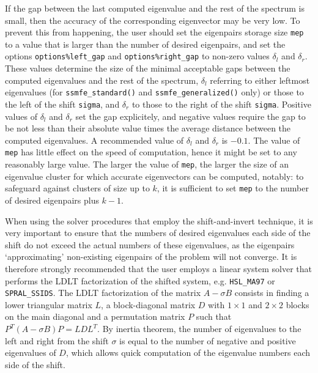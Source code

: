 If the gap %
between the last computed eigenvalue 
and the rest of the spectrum is small,
then the accuracy of the corresponding eigenvector may be very low.
To prevent this from happening,
the user should set the eigenpairs storage size {\tt mep}
to a value that is larger than the number of desired eigenpairs,
and set the options 
{\tt options\%left\_gap}
and
{\tt options\%right\_gap}
to non-zero values $\delta_l$ and $\delta_r$.
These values
determine the size of the minimal acceptable gaps
between the computed eigenvalues and the rest of the spectrum,
$\delta_l$ referring to either leftmost eigenvalues
(for {\tt ssmfe\_standard()} and {\tt ssmfe\_generalized()} only)
or those to the left of the shift {\tt sigma},
and $\delta_r$
to those to the right of the shift {\tt sigma}.
Positive values of $\delta_l$ and $\delta_r$
set the gap explicitely,
and negative values
require the gap to be not less than their absolute value times
the average distance between the computed eigenvalues.
A recommended value of $\delta_l$ and $\delta_r$ is $-0.1$.
The value of {\tt mep} %
has little effect on
the speed of computation,
hence it might be set to any reasonably large value.
The larger the value of {\tt mep}, 
the larger the size of an eigenvalue cluster
for which accurate eigenvectors can be computed, notably:
to safeguard against clusters of size up to $k$,
it is sufficient to set {\tt mep} to the number of desired eigenpairs
plus $k - 1$.

When using the solver procedures that employ the shift-and-invert technique,
it is very important to ensure that the numbers of desired eigenvalues
each side of the shift do not exceed the actual numbers of these eigenvalues,
as the eigenpairs `approximating' non-existing eigenpairs of the problem
will not converge.
It is therefore strongly recommended that the user employs 
a linear system solver that performs
the LDLT
factorization of %
the shifted system,
e.g. {\tt HSL\_MA97} or {\tt SPRAL\_SSIDS}.
The LDLT factorization of the matrix
$A - \sigma B$ consists in finding a lower triangular
matrix $L$, a block-diagonal matrix $D$
with $1\times 1$ and $2\times 2$ blocks on the main diagonal
and a permutation matrix $P$
such that $P^T(A - \sigma B)P = L D L^T$.
By inertia theorem,
the number of eigenvalues to the left and right from 
the shift $\sigma$
is equal to the number of negative and positive eigenvalues of $D$,
which allows quick computation of the eigenvalue numbers
each side of the shift. %

